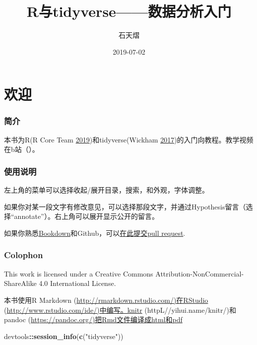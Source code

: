 \documentclass[]{book}
\title{R与tidyverse------数据分析入门}
\author{石天熠}
\date{2019-07-02}
\newenvironment{Shaded}{\begin{snugshade}}{\end{snugshade}}
\newcommand{\KeywordTok}[1]{\textcolor[rgb]{0.13,0.29,0.53}{\textbf{#1}}}
\newcommand{\NormalTok}[1]{#1}
\newcommand{\OperatorTok}[1]{\textcolor[rgb]{0.81,0.36,0.00}{\textbf{#1}}}
\newcommand{\StringTok}[1]{\textcolor[rgb]{0.31,0.60,0.02}{#1}}
\begin{document}
\maketitle

{
\setcounter{tocdepth}{1}
\tableofcontents
}
\hypertarget{welcome}{%
\chapter*{欢迎}\label{welcome}}

\hypertarget{ux7b80ux4ecb}{%
\subsection*{简介}\label{ux7b80ux4ecb}}

本书为R(R Core Team \protect\hyperlink{ref-R-base}{2019})和tidyverse(Wickham \protect\hyperlink{ref-R-tidyverse}{2017})的入门向教程。教学视频在b站（）。

\hypertarget{ux8bf4ux660e}{%
\subsection*{使用说明}\label{ux8bf4ux660e}}

左上角的菜单可以选择收起/展开目录，搜索，和外观，字体调整。

如果你对某一段文字有修改意见，可以选择那段文字，并通过Hypothesis留言（选择``annotate''）。右上角可以展开显示公开的留言。

如果你熟悉\href{https://bookdown.org}{Bookdown}和Github，可以\href{https://github.com/TianyiShi2001/R-Tutorial-Resorces}{在此提交pull request}.

\hypertarget{colophon}{%
\subsection*{Colophon}\label{colophon}}

This work is licensed under a Creative Commons Attribution-NonCommercial-ShareAlike 4.0 International License.
\doclicenseThis

本书使用R Markdown (\url{http://rmarkdown.rstudio.com/)在RStudio} (\url{http://www.rstudio.com/ide/)中编写。knitr} (httpL//yihui.name/knitr/)和pandoc (\url{https://pandoc.org/)把Rmd文件编译成html和pdf}

\begin{Shaded}
\begin{Highlighting}[]
\NormalTok{devtools}\OperatorTok{::}\KeywordTok{session_info}\NormalTok{(}\KeywordTok{c}\NormalTok{(}\StringTok{"tidyverse"}\NormalTok{))}
\end{Highlighting}
\end{Shaded}
\end{document}
